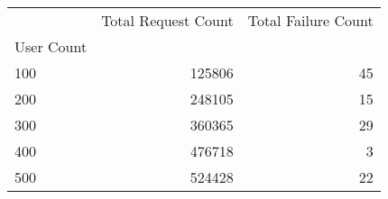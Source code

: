 \begin{tabular}{lrr}
\toprule
 & Total Request Count & Total Failure Count \\
User Count &  &  \\
\midrule
100 & 125806 & 45 \\
200 & 248105 & 15 \\
300 & 360365 & 29 \\
400 & 476718 & 3 \\
500 & 524428 & 22 \\
\bottomrule
\end{tabular}
